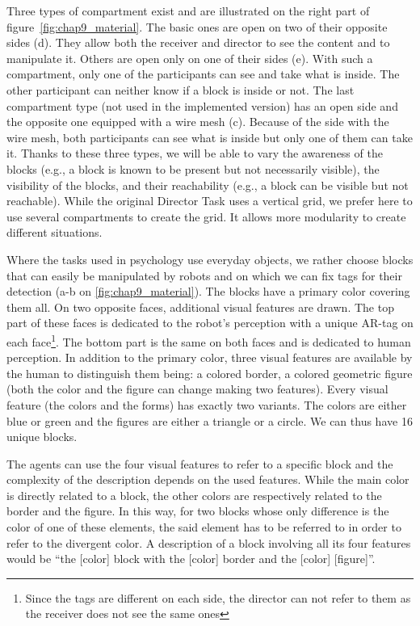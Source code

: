 Three types of compartment exist and are illustrated on the right part of figure~\ref{fig:chap9_material}. The basic ones are open on two of their opposite sides (d). They allow both the receiver and director to see the content and to manipulate it. Others are open only on one of their sides (e). With such a compartment, only one of the participants can see and take what is inside. The other participant can neither know if a block is inside or not. The last compartment type (not used in the implemented version) has an open side and the opposite one equipped with a wire mesh (c). Because of the side with the wire mesh, both participants can see what is inside but only one of them can take it. Thanks to these three types, we will be able to vary the awareness of the blocks (e.g., a block is known to be present but not necessarily visible), the visibility of the blocks, and their reachability (e.g., a block can be visible but not reachable). While the original Director Task uses a vertical grid, we prefer here to use several compartments to create the grid. It allows more modularity to create different situations.

Where the tasks used in psychology use everyday objects, we rather choose blocks that can easily be manipulated by robots and on which we can fix tags for their detection (a-b on \ref{fig:chap9_material}). The blocks have a primary color covering them all. On two opposite faces, additional visual features are drawn. The top part of these faces is dedicated to the robot's perception with a unique AR-tag on each face\footnote{Since the tags are different on each side, the director can not refer to them as the receiver does not see the same ones}. The bottom part is the same on both faces and is dedicated to human perception. In addition to the primary color, three visual features are available by the human to distinguish them being: a colored border, a colored geometric figure (both the color and the figure can change making two features). Every visual feature (the colors and the forms) has exactly two variants. The colors are either blue or green and the figures are either a triangle or a circle. We can thus have 16 unique blocks.

The agents can use the four visual features to refer to a specific block and the complexity of the description depends on the used features. While the main color is directly related to a block, the other colors are respectively related to the border and the figure. In this way, for two blocks whose only difference is the color of one of these elements, the said element has to be referred to in order to refer to the divergent color. A description of a block involving all its four features would be ``the [color] block with the [color] border and the [color] [figure]''.

